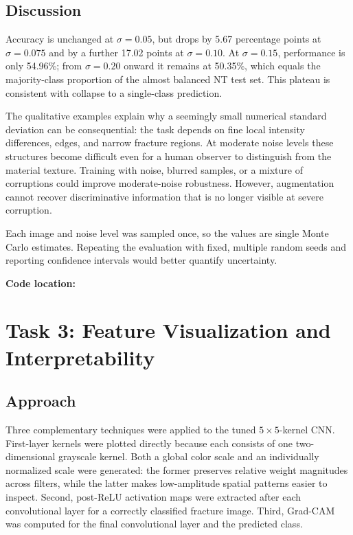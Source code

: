 \documentclass[11pt]{article}
\newcommand{\codelocation}[1]{\par\smallskip\noindent\textbf{Code location:} \path{#1}}
\begin{document}
\subsection{Discussion}

Accuracy is unchanged at $\sigma=0.05$, but drops by 5.67 percentage points at $\sigma=0.075$ and by a further 17.02 points at $\sigma=0.10$. At $\sigma=0.15$, performance is only 54.96\%; from $\sigma=0.20$ onward it remains at 50.35\%, which equals the majority-class proportion of the almost balanced NT test set. This plateau is consistent with collapse to a single-class prediction.

The qualitative examples explain why a seemingly small numerical standard deviation can be consequential: the task depends on fine local intensity differences, edges, and narrow fracture regions. At moderate noise levels these structures become difficult even for a human observer to distinguish from the material texture. Training with noise, blurred samples, or a mixture of corruptions could improve moderate-noise robustness. However, augmentation cannot recover discriminative information that is no longer visible at severe corruption.

Each image and noise level was sampled once, so the values are single Monte Carlo estimates. Repeating the evaluation with fixed, multiple random seeds and reporting confidence intervals would better quantify uncertainty.

\codelocation{tasks/task_2_robustness/}

\clearpage
\section{Task 3: Feature Visualization and Interpretability}

\subsection{Approach}

Three complementary techniques were applied to the tuned $5\times5$-kernel CNN. First-layer kernels were plotted directly because each consists of one two-dimensional grayscale kernel. Both a global color scale and an individually normalized scale were generated: the former preserves relative weight magnitudes across filters, while the latter makes low-amplitude spatial patterns easier to inspect. Second, post-ReLU activation maps were extracted after each convolutional layer for a correctly classified fracture image. Third, Grad-CAM~\cite{selvaraju2017gradcam} was computed for the final convolutional layer and the predicted class.
\end{document}
